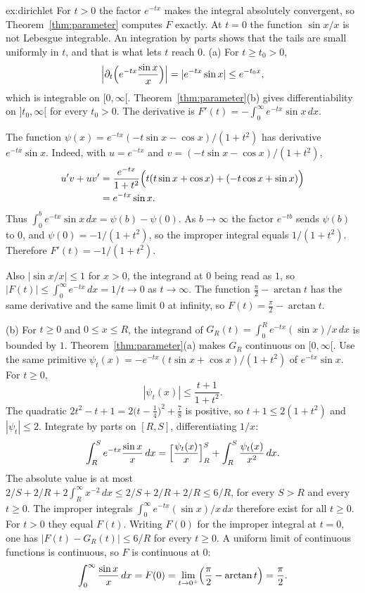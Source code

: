 \begin{solution}{ex:dirichlet}
\idea For \(t>0\) the factor \(e^{-tx}\) makes the integral absolutely convergent, so Theorem~\ref{thm:parameter} computes \(F\) exactly. At \(t=0\) the function \(\sin x/x\) is not Lebesgue integrable. An integration by parts shows that the tails are small uniformly in \(t\), and that is what lets \(t\) reach \(0\).
\writeup (a) For \(t\ge t_0>0\),
\[
\Bigl|\partial_t\Bigl(e^{-tx}\frac{\sin x}x\Bigr)\Bigr|=|e^{-tx}\sin x|\le e^{-t_0x},
\]
which is integrable on \([0,\infty[\). Theorem~\ref{thm:parameter}(b) gives differentiability on \(]t_0,\infty[\) for every \(t_0>0\). The derivative is \(F'(t)=-\int_0^\infty e^{-tx}\sin x\,dx\).

The function \(\psi(x)=e^{-tx}(-t\sin x-\cos x)/(1+t^2)\) has derivative \(e^{-tx}\sin x\). Indeed, with \(u=e^{-tx}\) and \(v=(-t\sin x-\cos x)/(1+t^2)\),
\begin{align*}
u'v+uv'
&=\frac{e^{-tx}}{1+t^2}\Bigl(t(t\sin x+\cos x)+(-t\cos x+\sin x)\Bigr)\\
&=e^{-tx}\sin x.
\end{align*}
Thus \(\int_0^b e^{-tx}\sin x\,dx=\psi(b)-\psi(0)\). As \(b\to\infty\) the factor \(e^{-tb}\) sends \(\psi(b)\) to \(0\), and \(\psi(0)=-1/(1+t^2)\), so the improper integral equals \(1/(1+t^2)\). Therefore \(F'(t)=-1/(1+t^2)\).

Also \(|\sin x/x|\le1\) for \(x>0\), the integrand at \(0\) being read as \(1\), so \(|F(t)|\le\int_0^\infty e^{-tx}\,dx=1/t\to0\) as \(t\to\infty\). The function \(\frac\pi2-\arctan t\) has the same derivative and the same limit \(0\) at infinity, so \(F(t)=\frac\pi2-\arctan t\).

(b) For \(t\ge0\) and \(0\le x\le R\), the integrand of \(G_R(t)=\int_0^Re^{-tx}(\sin x)/x\,dx\) is bounded by \(1\). Theorem~\ref{thm:parameter}(a) makes \(G_R\) continuous on \([0,\infty[\). Use the same primitive \(\psi_t(x)=-e^{-tx}(t\sin x+\cos x)/(1+t^2)\) of \(e^{-tx}\sin x\). For \(t\ge0\),
\[
|\psi_t(x)|\le\frac{t+1}{1+t^2}.
\]
The quadratic \(2t^2-t+1=2\bigl(t-\frac14\bigr)^2+\frac78\) is positive, so \(t+1\le2(1+t^2)\) and \(|\psi_t|\le2\). Integrate by parts on \([R,S]\), differentiating \(1/x\):
\[\int_R^Se^{-tx}\frac{\sin x}x\,dx=\Bigl[\frac{\psi_t(x)}x\Bigr]_R^S+\int_R^S\frac{\psi_t(x)}{x^2}\,dx.\]
The absolute value is at most \(2/S+2/R+2\int_R^\infty x^{-2}\,dx\le2/S+2/R+2/R\le6/R\), for every \(S>R\) and every \(t\ge0\). The improper integrals \(\int_0^\infty e^{-tx}(\sin x)/x\,dx\) therefore exist for all \(t\ge0\). For \(t>0\) they equal \(F(t)\). Writing \(F(0)\) for the improper integral at \(t=0\), one has \(|F(t)-G_R(t)|\le6/R\) for every \(t\ge0\). A uniform limit of continuous functions is continuous, so \(F\) is continuous at \(0\):
\[
\int_0^\infty\frac{\sin x}x\,dx=F(0)=\lim_{t\to0^+}\Bigl(\frac\pi2-\arctan t\Bigr)=\frac\pi2.
\]
\end{solution}

